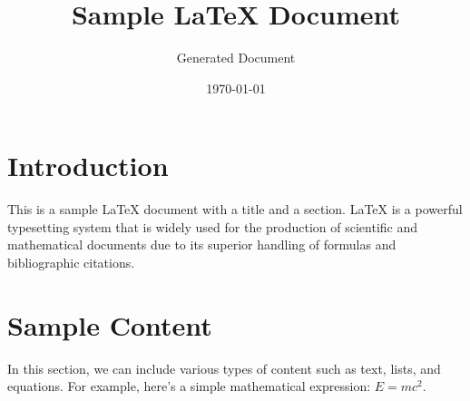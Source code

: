 \documentclass{article}
\title{Sample LaTeX Document}
\author{Generated Document}
\date{\today}
\begin{document}
\maketitle

\section{Introduction}
This is a sample LaTeX document with a title and a section. LaTeX is a powerful typesetting system that is widely used for the production of scientific and mathematical documents due to its superior handling of formulas and bibliographic citations.

\section{Sample Content}
In this section, we can include various types of content such as text, lists, and equations. For example, here's a simple mathematical expression: $E = mc^2$.
\end{document}
